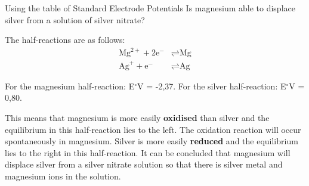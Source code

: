 \begin{wex}{Using the table of Standard Electrode Potentials}
{Is magnesium able to displace silver from a solution of silver nitrate?}
{
The half-reactions are as follows:
\begin{align*}
  \text{Mg}^{2+} + 2\text{e}^{-} &\rightleftharpoons \text{Mg} \\
  \text{Ag}^{+} + \text{e}^{-} &\rightleftharpoons \text{Ag}
\end{align*}

For the magnesium half-reaction: E$^{\circ}$V = -2,37. For the silver half-reaction: E$^{\circ}$V = 0,80.

This means that magnesium is more easily \textbf{oxidised} than silver and the equilibrium in this half-reaction lies to the left. The oxidation reaction will occur spontaneously in magnesium. Silver is more easily \textbf{reduced} and the equilibrium lies to the right in this half-reaction. It can be concluded that magnesium will displace silver from a silver nitrate solution so that there is silver metal and magnesium ions in the solution.
}
\end{wex}

\clearpage

